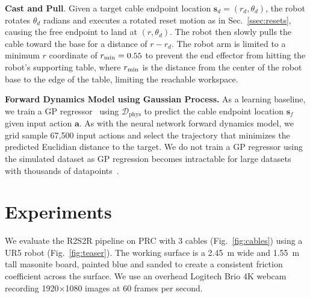 \documentclass[letterpaper, 10pt, conference]{ieeeconf}  %
\newcommand{\ba}{\mathbf{a}}
\newcommand{\bs}{\mathbf{s}}
\newcommand{\dreal}{\mathcal{D}_\textrm{phys}}
\newcommand{\polarcasting}{Cast and Pull\xspace}
\begin{document}
\textbf{\polarcasting}. Given a target cable endpoint location $\bs_d = (r_d,\theta_d)$, the robot rotates $\theta_d$ radians and executes a rotated reset motion as in Sec.~\ref{ssec:resets}, causing the free endpoint to land at $(r, \theta_d)$. The robot then slowly pulls the cable toward the base for a distance of $r - r_d$. The robot arm is limited to a minimum $r$ coordinate of $r_{\rm min}=0.55$ to prevent the end effector from hitting the robot's supporting table, where $r_{\rm min}$ is the distance from the center of the robot base to the edge of the table, limiting the reachable workspace. 

\textbf{Forward Dynamics Model using Gaussian Process.} As a learning baseline, we train a GP regressor~\cite{Gaussian_process_ML,Mukadam_2018} using $\dreal$ to predict the cable endpoint location $\bs_f$ given input action $\ba$. As with the neural network forward dynamics model, we grid sample 67,500 input actions and select the trajectory that minimizes the predicted Euclidian distance to the target. We do not train a GP regressor using the simulated dataset as GP regression becomes intractable for large datasets with thousands of datapoints~\cite{belyaev2014exact}.

\section{Experiments}
\label{sec:experiments}

We evaluate the R2S2R pipeline on PRC with 3 cables (Fig.~\ref{fig:cables}) using a UR5 robot (Fig.~\ref{fig:teaser}).
The working surface is a \SI{2.45}{\meter} wide and \SI{1.55}{\meter} tall masonite board, painted blue and sanded to create a consistent friction coefficient across the surface. We use an overhead Logitech Brio 4K webcam recording 1920$\times$1080 images at 60 frames per second.

\end{document}
